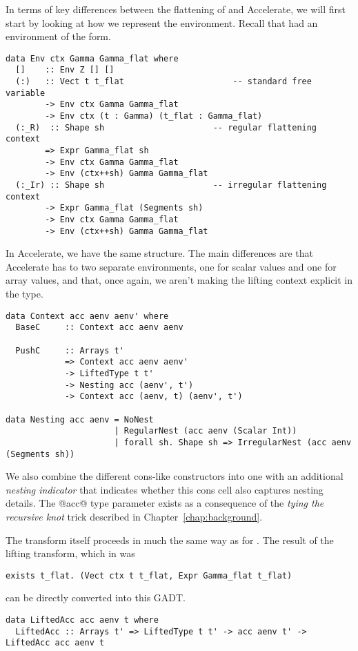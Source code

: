 In terms of key differences between the flattening of \ndp{} and Accelerate, we will first start by looking at how we represent the environment. Recall that \ndp{} had an environment of the form.
%
\begin{lstlisting}[style=ndp]
data Env ctx Gamma Gamma_flat where
  []    :: Env Z [] []
  (:)   :: Vect t t_flat                      -- standard free variable
        -> Env ctx Gamma Gamma_flat
        -> Env ctx (t : Gamma) (t_flat : Gamma_flat)
  (:_R)  :: Shape sh                      -- regular flattening context
        => Expr Gamma_flat sh
        -> Env ctx Gamma Gamma_flat
        -> Env (ctx++sh) Gamma Gamma_flat
  (:_Ir) :: Shape sh                      -- irregular flattening context
        -> Expr Gamma_flat (Segments sh)
        -> Env ctx Gamma Gamma_flat
        -> Env (ctx++sh) Gamma Gamma_flat
\end{lstlisting}
%
In Accelerate, we have the same structure. The main differences are that Accelerate has to two separate environments, one for scalar values and one for array values, and that, once again, we aren't making the lifting context explicit in the type.
%
\begin{lstlisting}
data Context acc aenv aenv' where
  BaseC     :: Context acc aenv aenv

  PushC     :: Arrays t'
            => Context acc aenv aenv'
            -> LiftedType t t'
            -> Nesting acc (aenv', t')
            -> Context acc (aenv, t) (aenv', t')

data Nesting acc aenv = NoNest
                      | RegularNest (acc aenv (Scalar Int))
                      | forall sh. Shape sh => IrregularNest (acc aenv (Segments sh))
\end{lstlisting}
%
We also combine the different cons-like constructors into one with an additional \emph{nesting indicator} that indicates whether this cons cell also captures nesting details. The @acc@ type parameter exists as a consequence of the \emph{tying the recursive knot} trick described in Chapter~\ref{chap:background}.

The transform itself proceeds in much the same way as for \ndp{}. The result of the lifting transform, which in \ndp{} was
%
\begin{lstlisting}[style=ndp]
exists t_flat. (Vect ctx t t_flat, Expr Gamma_flat t_flat)
\end{lstlisting}
%
can be directly converted into this GADT.
%
\begin{lstlisting}
data LiftedAcc acc aenv t where
  LiftedAcc :: Arrays t' => LiftedType t t' -> acc aenv t' -> LiftedAcc acc aenv t
\end{lstlisting}
%

